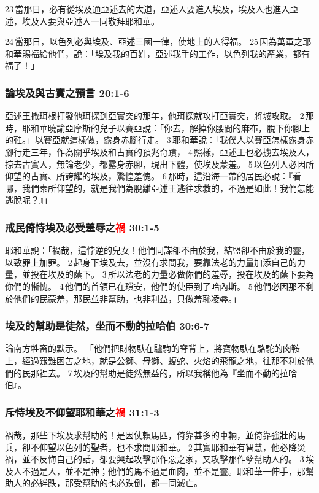 23 當那日，必有從埃及通亞述去的大道，亞述人要進入埃及，埃及人也進入亞述，埃及人要與亞述人一同敬拜耶和華。

24 當那日，以色列必與埃及、亞述三國一律，使地上的人得福。 25 因為萬軍之耶和華賜福給他們，說：「埃及我的百姓，亞述我手的工作，以色列我的產業，都有福了！」

\subsubsection{論埃及與古實之預言 20:1-6}
亞述王撒珥根打發他珥探到亞實突的那年，他珥探就攻打亞實突，將城攻取。 2 那時，耶和華曉諭亞摩斯的兒子以賽亞說：「你去，解掉你腰間的麻布，脫下你腳上的鞋。」以賽亞就這樣做，露身赤腳行走。 3 耶和華說：「我僕人以賽亞怎樣露身赤腳行走三年，作為關乎埃及和古實的預兆奇蹟， 4 照樣，亞述王也必擄去埃及人，掠去古實人，無論老少，都露身赤腳，現出下體，使埃及蒙羞。 5 以色列人必因所仰望的古實、所誇耀的埃及，驚惶羞愧。 6 那時，這沿海一帶的居民必說：『看哪，我們素所仰望的，就是我們為脫離亞述王逃往求救的，不過是如此！我們怎能逃脫呢？』」

\subsubsection{戒民倚恃埃及必受羞辱之\textcolor{red}{禍} 30:1-5}
耶和華說：「禍哉，這悖逆的兒女！他們同謀卻不由於我，結盟卻不由於我的靈，以致罪上加罪。 2 起身下埃及去，並沒有求問我，要靠法老的力量加添自己的力量，並投在埃及的蔭下。 3 所以法老的力量必做你們的羞辱，投在埃及的蔭下要為你們的慚愧。 4 他們的首領已在瑣安，他們的使臣到了哈內斯。 5 他們必因那不利於他們的民蒙羞，那民並非幫助，也非利益，只做羞恥凌辱。」


\subsubsection{埃及的幫助是徒然，坐而不動的拉哈伯 30:6-7}
論南方牲畜的默示。
「他們把財物馱在驢駒的脊背上，將寶物馱在駱駝的肉鞍上，經過艱難困苦之地，就是公獅、母獅、蝮蛇、火焰的飛龍之地，往那不利於他們的民那裡去。 7 埃及的幫助是徒然無益的，所以我稱他為『坐而不動的拉哈伯』。

\subsubsection{斥恃埃及不仰望耶和華之\textcolor{red}{禍} 31:1-3}
禍哉，那些下埃及求幫助的！是因仗賴馬匹，倚靠甚多的車輛，並倚靠強壯的馬兵，卻不仰望以色列的聖者，也不求問耶和華。 2 其實耶和華有智慧，他必降災禍，並不反悔自己的話，卻要興起攻擊那作惡之家，又攻擊那作孽幫助人的。 3 埃及人不過是人，並不是神；他們的馬不過是血肉，並不是靈。耶和華一伸手，那幫助人的必絆跌，那受幫助的也必跌倒，都一同滅亡。


